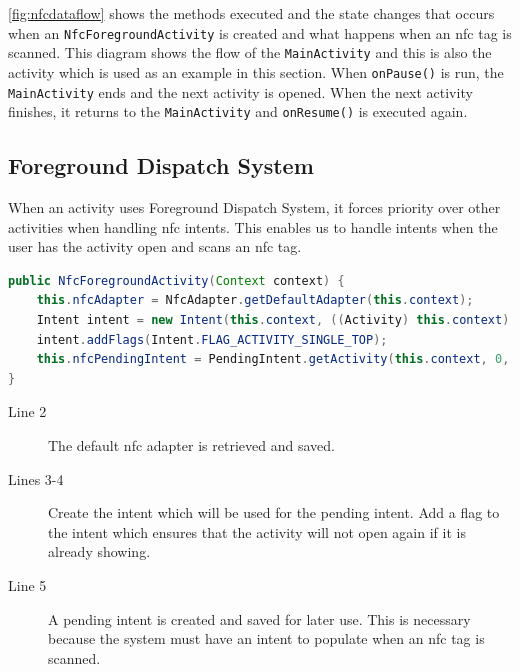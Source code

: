 \autoref{fig:nfcdataflow} shows the methods executed and the state changes that occurs when an \lstinline|NfcForegroundActivity| is created and what happens when an \ac{nfc} tag is scanned. This diagram shows the flow of the \lstinline|MainActivity| and this is also the activity which is used as an example in this section. When \lstinline|onPause()| is run, the \lstinline|MainActivity| ends and the next activity is opened. When the next activity finishes, it returns to the \lstinline|MainActivity| and \lstinline|onResume()| is executed again.

\subsection*{Foreground Dispatch System}
\label{sec:foreground}

When an activity uses Foreground Dispatch System, it forces priority over other activities when handling \ac{nfc} intents\citep{foregroundDispatch}. This enables us to handle intents when the user has the activity open and scans an \ac{nfc} tag.

\begin{lstlisting}[language=java, label=nfcForegroundOnCreate, caption={Initializing the pending intent}]
public NfcForegroundActivity(Context context) { 
    this.nfcAdapter = NfcAdapter.getDefaultAdapter(this.context);
    Intent intent = new Intent(this.context, ((Activity) this.context).getClass());
    intent.addFlags(Intent.FLAG_ACTIVITY_SINGLE_TOP);
    this.nfcPendingIntent = PendingIntent.getActivity(this.context, 0, intent ,0);
}
\end{lstlisting}
\begin{description}
\item[Line 2] The default \ac{nfc} adapter is retrieved and saved.
\item[Lines 3-4] Create the intent which will be used for the pending intent. Add a flag to the intent which ensures that the activity will not open again if it is already showing.
\item[Line 5] A pending intent is created and saved for later use. This is necessary because the system must have an intent to populate when an \ac{nfc} tag is scanned.
\end{description}

